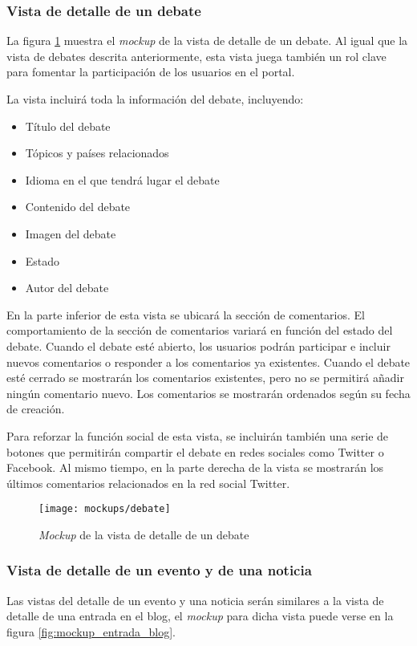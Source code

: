\subsubsection{Vista de detalle de un debate}
La figura \ref{fig:mockup_debate} muestra el \textit{mockup} de la vista de detalle de un debate.  Al igual que la vista de debates descrita anteriormente, esta vista juega también un rol clave para fomentar la participación de los usuarios en el portal.

La vista incluirá toda la información del debate, incluyendo:
\begin{itemize}
	\item Título del debate
	\item Tópicos y países relacionados
	\item Idioma en el que tendrá lugar el debate
	\item Contenido del debate
	\item Imagen del debate
	\item Estado
	\item Autor del debate
\end{itemize}

En la parte inferior de esta vista se ubicará la sección de comentarios.  El comportamiento de la sección de comentarios variará en función del estado del debate.  Cuando el debate esté abierto, los usuarios podrán participar e incluir nuevos comentarios o  responder a los comentarios ya existentes.  Cuando el debate esté cerrado se mostrarán los comentarios existentes, pero no se permitirá añadir ningún comentario nuevo.  Los comentarios se mostrarán ordenados según su fecha de creación.

Para reforzar la función social de esta vista, se incluirán también una serie de botones que permitirán compartir el debate en redes sociales como Twitter o Facebook.  Al mismo tiempo, en la parte derecha de la vista se mostrarán los últimos comentarios relacionados en la red social Twitter.

\begin{figure}[h]
	\centering
	\texttt{[image: mockups/debate]}
	\caption{\textit{Mockup} de la vista de detalle de un debate}
	\label{fig:mockup_debate}
\end{figure}


\subsubsection{Vista de detalle de un evento y de una noticia}
\label{mockup_noticia_evento}
Las vistas del detalle de un evento y una noticia serán similares a la vista de detalle de una entrada en el blog, el \textit{mockup} para dicha vista puede verse en la figura \ref{fig:mockup_entrada_blog}.

